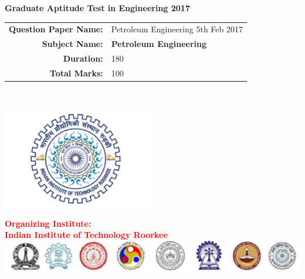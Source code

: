 \documentclass[12pt]{article}
\begin{document}
\begin{center}
    \textbf{\huge Graduate Aptitude Test in Engineering 2017}\\[2cm]
{
\Large

    \begin{tabular}{rl}
        \textbf{Question Paper Name:} & Petroleum Engineering 5th Feb 2017 \\
        \textbf{Subject Name:} & \textbf{Petroleum Engineering} \\
        \textbf{Duration:} & 180 \\
        \textbf{Total Marks:} & 100 \\
    \end{tabular}\\[3cm]
}
    \includegraphics[width=0.5\textwidth]{Figs/IITRoorkee.png}\\[2cm]

    {\textcolor{red}{ \Large \textbf{\Huge{Organizing Institute:}}}}\\[0.5em]
    {\textcolor{red}{ \LARGE \textbf{\huge{Indian Institute of Technology Roorkee}}}}\\[2cm]

    \includegraphics[width=\textwidth]{Figs/alliits.png}
\end{center}

\thispagestyle{empty}

\newpage
\end{document}
